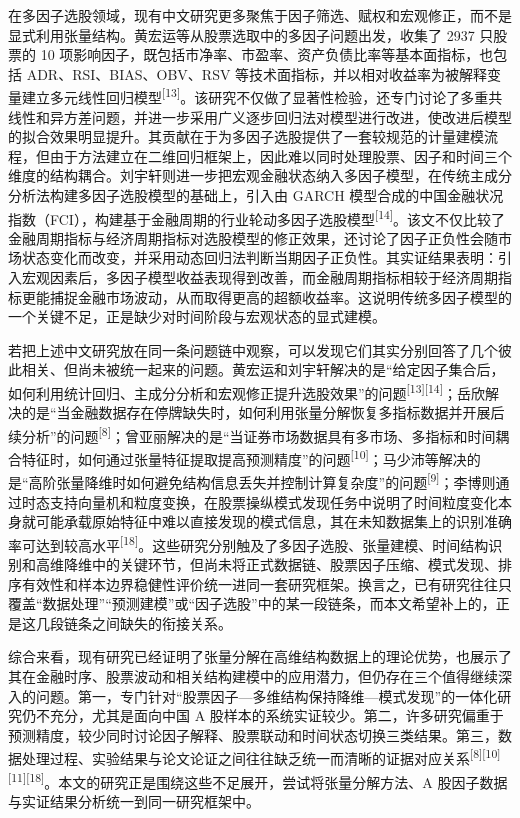 在多因子选股领域，现有中文研究更多聚焦于因子筛选、赋权和宏观修正，而不是显式利用张量结构。黄宏运等从股票选取中的多因子问题出发，收集了 2937 只股票的 10 项影响因子，既包括市净率、市盈率、资产负债比率等基本面指标，也包括 ADR、RSI、BIAS、OBV、RSV 等技术面指标，并以相对收益率为被解释变量建立多元线性回归模型\textsuperscript{[13]}。该研究不仅做了显著性检验，还专门讨论了多重共线性和异方差问题，并进一步采用广义逐步回归法对模型进行改进，使改进后模型的拟合效果明显提升。其贡献在于为多因子选股提供了一套较规范的计量建模流程，但由于方法建立在二维回归框架上，因此难以同时处理股票、因子和时间三个维度的结构耦合。刘宇轩则进一步把宏观金融状态纳入多因子模型，在传统主成分分析法构建多因子选股模型的基础上，引入由 GARCH 模型合成的中国金融状况指数（FCI），构建基于金融周期的行业轮动多因子选股模型\textsuperscript{[14]}。该文不仅比较了金融周期指标与经济周期指标对选股模型的修正效果，还讨论了因子正负性会随市场状态变化而改变，并采用动态回归法判断当期因子正负性。其实证结果表明：引入宏观因素后，多因子模型收益表现得到改善，而金融周期指标相较于经济周期指标更能捕捉金融市场波动，从而取得更高的超额收益率。这说明传统多因子模型的一个关键不足，正是缺少对时间阶段与宏观状态的显式建模。

若把上述中文研究放在同一条问题链中观察，可以发现它们其实分别回答了几个彼此相关、但尚未被统一起来的问题。黄宏运和刘宇轩解决的是“给定因子集合后，如何利用统计回归、主成分分析和宏观修正提升选股效果”的问题\textsuperscript{[13][14]}；岳欣解决的是“当金融数据存在停牌缺失时，如何利用张量分解恢复多指标数据并开展后续分析”的问题\textsuperscript{[8]}；曾亚丽解决的是“当证券市场数据具有多市场、多指标和时间耦合特征时，如何通过张量特征提取提高预测精度”的问题\textsuperscript{[10]}；马少沛等解决的是“高阶张量降维时如何避免结构信息丢失并控制计算复杂度”的问题\textsuperscript{[9]}；李博则通过时态支持向量机和粒度变换，在股票操纵模式发现任务中说明了时间粒度变化本身就可能承载原始特征中难以直接发现的模式信息，其在未知数据集上的识别准确率可达到较高水平\textsuperscript{[18]}。这些研究分别触及了多因子选股、张量建模、时间结构识别和高维降维中的关键环节，但尚未将正式数据链、股票因子压缩、模式发现、排序有效性和样本边界稳健性评价统一进同一套研究框架。换言之，已有研究往往只覆盖“数据处理”“预测建模”或“因子选股”中的某一段链条，而本文希望补上的，正是这几段链条之间缺失的衔接关系。

综合来看，现有研究已经证明了张量分解在高维结构数据上的理论优势，也展示了其在金融时序、股票波动和相关结构建模中的应用潜力，但仍存在三个值得继续深入的问题。第一，专门针对“股票因子—多维结构保持降维—模式发现”的一体化研究仍不充分，尤其是面向中国 A 股样本的系统实证较少。第二，许多研究偏重于预测精度，较少同时讨论因子解释、股票联动和时间状态切换三类结果。第三，数据处理过程、实验结果与论文论证之间往往缺乏统一而清晰的证据对应关系\textsuperscript{[8][10][11][18]}。本文的研究正是围绕这些不足展开，尝试将张量分解方法、A 股因子数据与实证结果分析统一到同一研究框架中。

